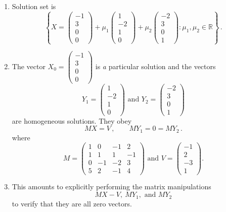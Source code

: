 \begin{enumerate}
\begin{enumerate}
\item
Solution set is 
\[
\left\{X=\begin{pmatrix}-1\\3 \\ 0\\0\end{pmatrix}
+\mu_1 \begin{pmatrix} 1 \\-2\\1\\0\end{pmatrix}
+\mu_2 \begin{pmatrix}-2\\3\\0\\1\end{pmatrix}
\colon \mu_1,\mu_2 \in \mathbb{R}
\right\}\, .
\]

\item
The vector $X_0=\begin{pmatrix}-1\\3 \\ 0\\0\end{pmatrix}$ is {\itshape a } particular solution and the vectors 
\[Y_1=\begin{pmatrix} 1 \\-2\\1\\0\end{pmatrix} 
\text{~and~}
Y_2= \begin{pmatrix}-2\\3\\0\\1\end{pmatrix}\] 
are homogeneous solutions.
They obey
\[
MX=V\, ,\qquad M Y_1=0=MY_2\, .
\]
where 
\[M=\left(\begin{array}{rrrr}
1&0&-1&2\\
1&1&1&-1\\
0&-1&-2&3\\
5&2&-1&4
\end{array}\right) \text{~and~}
V=\begin{pmatrix}-1\\2\\-3\\1\end{pmatrix}.\] 

\item This amounts to  explicitly performing the matrix manipulations 
\[MX-V,~ MY_1, \text{~and~} MY_2\]
to verify that they are all zero vectors.


\end{enumerate}
\end{enumerate}
